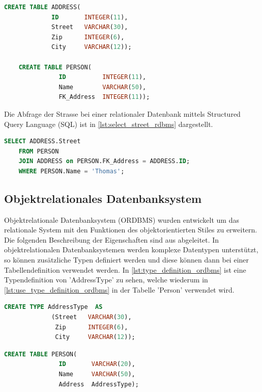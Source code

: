 \begin{lstlisting}[language=SQL, caption=Tabellendefinition in relationalem Datenbanksystem, label=lst:table_definition_rdbms]  
    CREATE TABLE ADDRESS(
             ID       INTEGER(11),
             Street   VARCHAR(30),
             Zip      INTEGER(6),
             City     VARCHAR(12));

    CREATE TABLE PERSON(
               ID          INTEGER(11),
               Name        VARCHAR(50),
               FK_Address  INTEGER(11));
\end{lstlisting}

Die Abfrage der Strasse bei einer relationaler Datenbank mittels Structured Query Language (SQL) ist in \autoref{lst:select_street_rdbms} dargestellt.

\begin{lstlisting}[language=SQL, caption=Abfrage in relationalem Datenbanksystem, label=lst:select_street_rdbms]  
    SELECT ADDRESS.Street
    FROM PERSON 
    JOIN ADDRESS on PERSON.FK_Address = ADDRESS.ID;
    WHERE PERSON.Name = 'Thomas';
\end{lstlisting}

\subsection{Objektrelationales Datenbanksystem}\label{ordbms}
Objektrelationale Datenbanksystem (ORDBMS) wurden entwickelt um das relationale System mit den Funktionen des objektorientierten Stiles zu erweitern.
Die folgenden Beschreibung der Eigenschaften sind aus \cite{limited2010introduction} abgeleitet. In objektrelationalen Datenbanksystemen werden 
komplexe Datentypen unterstützt, so können zusätzliche Typen definiert werden und diese können dann bei einer Tabellendefinition verwendet werden.  
In \autoref{lst:type_definition_ordbms} ist eine Typendefinition von 'AddressType' zu sehen, welche wiederum in \autoref{lst:use_type_definition_ordbms} 
in der Tabelle 'Person' verwendet wird.

\begin{lstlisting}[language=SQL, caption=Typendefinition in objektrelationalem Datenbanksystem, label=lst:type_definition_ordbms]  
    CREATE TYPE AddressType  AS
             (Street   VARCHAR(30),
              Zip      INTEGER(6),
              City     VARCHAR(12));
\end{lstlisting}

\begin{lstlisting}[language=SQL, caption=Verwendung von Typendefinition in objektrelationalem Datenbanksystem, label=lst:use_type_definition_ordbms]  
    CREATE TABLE PERSON(
               ID       VARCHAR(20),
               Name     VARCHAR(50),
               Address  AddressType);
\end{lstlisting}

